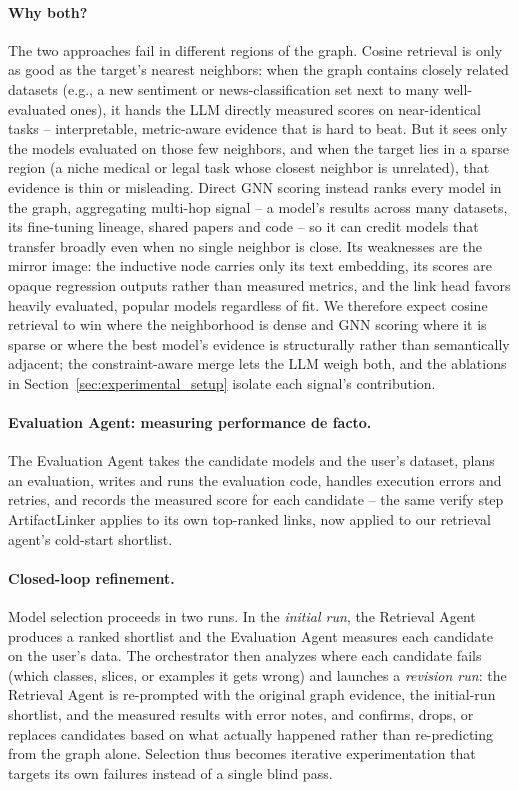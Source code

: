 \paragraph{Why both?}
The two approaches fail in different regions of the graph. Cosine retrieval is only as good as the target's nearest neighbors: when the graph contains closely related datasets (e.g., a new sentiment or news-classification set next to many well-evaluated ones), it hands the LLM directly measured scores on near-identical tasks -- interpretable, metric-aware evidence that is hard to beat. But it sees only the models evaluated on those few neighbors, and when the target lies in a sparse region (a niche medical or legal task whose closest neighbor is unrelated), that evidence is thin or misleading. Direct GNN scoring instead ranks every model in the graph, aggregating multi-hop signal -- a model's results across many datasets, its fine-tuning lineage, shared papers and code -- so it can credit models that transfer broadly even when no single neighbor is close. Its weaknesses are the mirror image: the inductive node carries only its text embedding, its scores are opaque regression outputs rather than measured metrics, and the link head favors heavily evaluated, popular models regardless of fit. We therefore expect cosine retrieval to win where the neighborhood is dense and GNN scoring where it is sparse or where the best model's evidence is structurally rather than semantically adjacent; the constraint-aware merge lets the LLM weigh both, and the ablations in Section~\ref{sec:experimental_setup} isolate each signal's contribution.

\paragraph{Evaluation Agent: measuring performance de facto.}
The Evaluation Agent takes the candidate models and the user's dataset, plans an evaluation, writes and runs the evaluation code, handles execution errors and retries, and records the measured score for each candidate -- the same verify step ArtifactLinker applies to its own top-ranked links, now applied to our retrieval agent's cold-start shortlist.

\paragraph{Closed-loop refinement.}
Model selection proceeds in two runs. In the \emph{initial run}, the Retrieval Agent produces a ranked shortlist and the Evaluation Agent measures each candidate on the user's data. The orchestrator then analyzes where each candidate fails (which classes, slices, or examples it gets wrong) and launches a \emph{revision run}: the Retrieval Agent is re-prompted with the original graph evidence, the initial-run shortlist, and the measured results with error notes, and confirms, drops, or replaces candidates based on what actually happened rather than re-predicting from the graph alone. Selection thus becomes iterative experimentation that targets its own failures instead of a single blind pass.
